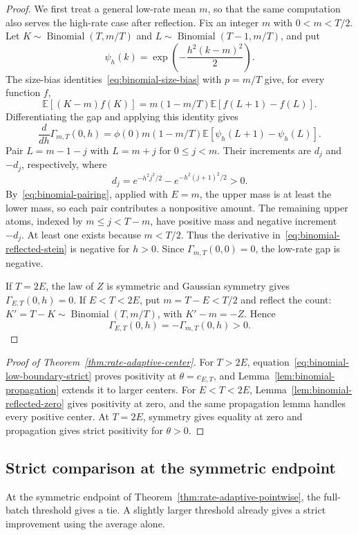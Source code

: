 \documentclass[11pt]{article}
\theoremstyle{remark}
\newcommand{\E}{\mathbb E}
\begin{document}
\begin{proof}
We first treat a general low-rate mean $m$, so that the same computation also
serves the high-rate case after reflection. Fix an integer $m$ with
$0<m<T/2$. Let $K\sim\operatorname{Binomial}(T,m/T)$ and
$L\sim\operatorname{Binomial}(T-1,m/T)$, and put
\[
 \psi_h(k)=\exp\left(-\frac{h^2(k-m)^2}{2}\right).
\]
The size-bias identities~\eqref{eq:binomial-size-bias} with $p=m/T$ give,
for every function $f$,
\[
 \E[(K-m)f(K)]
 =m(1-m/T)\E[f(L+1)-f(L)].
\]
Differentiating the gap and applying this identity gives
\begin{equation}\label{eq:binomial-reflected-stein}
 \frac{d}{dh}\Gamma_{m,T}(0,h)
 =\phi(0)m(1-m/T)\E[\psi_h(L+1)-\psi_h(L)].
\end{equation}
Pair $L=m-1-j$ with $L=m+j$ for $0\leq j<m$. Their increments are $d_j$
and $-d_j$, respectively, where
\[
 d_j=e^{-h^2j^2/2}-e^{-h^2(j+1)^2/2}>0.
\]
By~\eqref{eq:binomial-pairing}, applied with $E=m$, the upper mass is at
least the lower mass, so each pair contributes a nonpositive amount.
The remaining upper atoms, indexed by $m\leq j<T-m$, have positive mass
and negative increment $-d_j$. At least one exists because $m<T/2$.
Thus the derivative in~\eqref{eq:binomial-reflected-stein} is negative for
$h>0$. Since $\Gamma_{m,T}(0,0)=0$, the low-rate gap is negative.

If $T=2E$, the law of $Z$ is symmetric and Gaussian symmetry gives
$\Gamma_{E,T}(0,h)=0$. If $E<T<2E$, put $m=T-E<T/2$ and reflect the count:
$K'=T-K\sim\operatorname{Binomial}(T,m/T)$, with $K'-m=-Z$. Hence
\[
 \Gamma_{E,T}(0,h)=-\Gamma_{m,T}(0,h)>0.
\]
\end{proof}

\begin{proof}[Proof of Theorem~\ref{thm:rate-adaptive-center}]
For $T>2E$, equation~\eqref{eq:binomial-low-boundary-strict} proves positivity
at $\theta=c_{E,T}$, and Lemma~\ref{lem:binomial-propagation} extends it to
larger centers. For $E<T<2E$, Lemma~\ref{lem:binomial-reflected-zero} gives
positivity at zero, and the same propagation lemma handles every positive
center. At $T=2E$, symmetry gives equality at zero and propagation gives
strict positivity for $\theta>0$.
\end{proof}

\subsection{Strict comparison at the symmetric endpoint}
At the symmetric endpoint of Theorem~\ref{thm:rate-adaptive-pointwise}, the
full-batch threshold gives a tie. A slightly larger threshold already
gives a strict improvement using the average alone.
\end{document}
